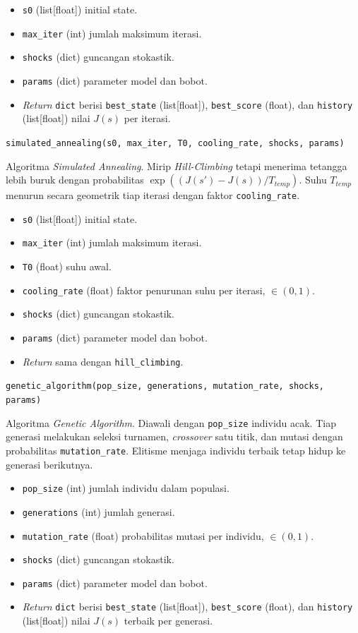 \begin{itemize}
    \item \texttt{s0} (list[float]) initial state.
    \item \texttt{max\_iter} (int) jumlah maksimum iterasi.
    \item \texttt{shocks} (dict) guncangan stokastik.
    \item \texttt{params} (dict) parameter model dan bobot.
    \item \textit{Return} \texttt{dict} berisi \texttt{best\_state} (list[float]), \texttt{best\_score} (float), dan \texttt{history} (list[float]) nilai $J(s)$ per iterasi.
\end{itemize}

\texttt{simulated\_annealing(s0, max\_iter, T0, cooling\_rate, shocks, params)}

Algoritma \textit{Simulated Annealing}. Mirip \textit{Hill-Climbing} tetapi menerima tetangga lebih buruk dengan probabilitas $\exp((J(s') - J(s)) / T_{temp})$. Suhu $T_{temp}$ menurun secara geometrik tiap iterasi dengan faktor \texttt{cooling\_rate}.

\begin{itemize}
    \item \texttt{s0} (list[float]) initial state.
    \item \texttt{max\_iter} (int) jumlah maksimum iterasi.
    \item \texttt{T0} (float) suhu awal.
    \item \texttt{cooling\_rate} (float) faktor penurunan suhu per iterasi, $\in (0, 1)$.
    \item \texttt{shocks} (dict) guncangan stokastik.
    \item \texttt{params} (dict) parameter model dan bobot.
    \item \textit{Return} sama dengan \texttt{hill\_climbing}.
\end{itemize}

\texttt{genetic\_algorithm(pop\_size, generations, mutation\_rate, shocks, params)}

Algoritma \textit{Genetic Algorithm}. Diawali dengan \texttt{pop\_size} individu acak. Tiap generasi melakukan seleksi turnamen, \textit{crossover} satu titik, dan mutasi dengan probabilitas \texttt{mutation\_rate}. Elitisme menjaga individu terbaik tetap hidup ke generasi berikutnya.

\begin{itemize}
    \item \texttt{pop\_size} (int) jumlah individu dalam populasi.
    \item \texttt{generations} (int) jumlah generasi.
    \item \texttt{mutation\_rate} (float) probabilitas mutasi per individu, $\in (0, 1)$.
    \item \texttt{shocks} (dict) guncangan stokastik.
    \item \texttt{params} (dict) parameter model dan bobot.
    \item \textit{Return} \texttt{dict} berisi \texttt{best\_state} (list[float]), \texttt{best\_score} (float), dan \texttt{history} (list[float]) nilai $J(s)$ terbaik per generasi.
\end{itemize}

